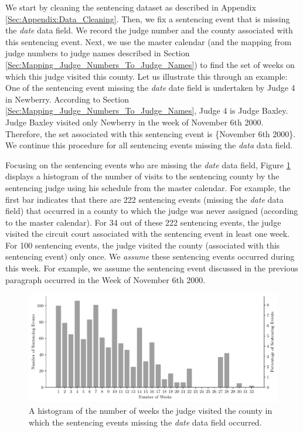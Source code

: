 \documentclass[11pt]{article}
\theoremstyle{ModifiedStyle}
\begin{document}
      We start by cleaning the sentencing dataset as described in Appendix \ref{Sec:Appendix:Data_Cleaning}. Then, we fix a sentencing event that is missing the \emph{date} data field. We record the judge number and the county associated with this sentencing event. Next, we use the master calendar (and the mapping from judge numbers to judge names described in Section \ref{Sec:Mapping_Judge_Numbers_To_Judge_Names}) to find the set of weeks on which this judge visited this county. Let us illustrate this through an example: One of the sentencing event missing the \emph{date} date field is undertaken by Judge 4 in Newberry. According to Section \ref{Sec:Mapping_Judge_Numbers_To_Judge_Names}, Judge 4 is Judge Baxley. Judge Baxley visited only Newberry in the week of November 6th 2000. Therefore, the set associated with this sentencing event is \{November 6th 2000\}. We continue this procedure for all sentencing events missing the \emph{data} data field.

      Focusing on the sentencing events who are missing the \emph{date} data field, Figure \ref{Figure_Missing_Date_Histogram_of_Potential_Week_Histogram} displays a histogram of the number of visits to the sentencing county by the sentencing judge using his schedule from the master calendar. For example, the first bar indicates that there are 222 sentencing events (missing the \emph{date} data field) that occurred in a county to which the judge was never assigned (according to the master calendar). For 34 out of these 222 sentencing events, the judge visited the circuit court associated with the sentencing event in least one week. For 100 sentencing events, the judge visited the county (associated with this sentencing event) only once. We \emph{assume} these sentencing events occurred during this week. For example, we assume the sentencing event discussed in the previous paragraph occurred in the Week of November 6th 2000.

      \begin{figure}[H]
        \centering
        \includegraphics[scale=0.75]{Figures/Missing_Date_Histogram_of_Potential_Week_Histogram}
        \caption{A histogram of the number of weeks the judge visited the county in which the sentencing events missing the \emph{date} data field occurred.}
        \label{Figure_Missing_Date_Histogram_of_Potential_Week_Histogram}
      \end{figure}
\end{document}
